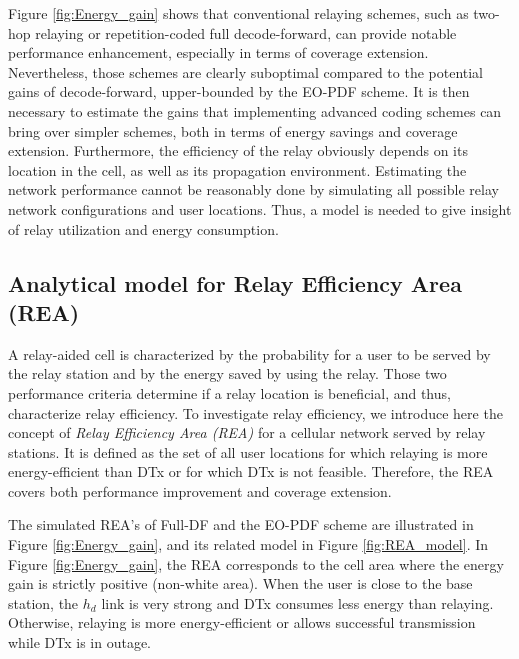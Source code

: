 \documentclass[journal]{IEEEtran}
\theoremstyle{definition}
\begin{document}
Figure \ref{fig:Energy_gain} shows that conventional relaying schemes, such as two-hop relaying or repetition-coded full decode-forward, can provide notable performance enhancement, especially in terms of coverage extension. Nevertheless, those schemes are clearly suboptimal compared to the potential gains of decode-forward, upper-bounded by the EO-PDF scheme. It is then necessary to estimate the gains that implementing advanced coding schemes can bring over simpler schemes, both in terms of energy savings and coverage extension. Furthermore, the efficiency of the relay obviously depends on its location in the cell, as well as its propagation environment. 
Estimating the network performance cannot be reasonably done by simulating all possible relay network configurations and user locations. Thus, a model is needed to give insight of relay utilization and energy consumption.



\subsection{Analytical model for Relay Efficiency Area (REA)}

A relay-aided cell is characterized by the probability for a user to be served by the relay station and by the energy saved by using the relay. Those two performance criteria determine if a relay location is beneficial, and thus, characterize relay efficiency.
To investigate relay efficiency, we introduce here the concept of \textit{Relay Efficiency Area (REA)} for a cellular network served by relay stations. It is defined as the set of all user locations for which relaying is more energy-efficient than DTx or for which DTx is not feasible. Therefore, the REA covers both performance improvement and coverage extension.  

The simulated REA's of Full-DF and the EO-PDF scheme are illustrated in Figure \ref{fig:Energy_gain}, and its related model in Figure \ref{fig:REA_model}. In Figure \ref{fig:Energy_gain}, the REA corresponds to the cell area where the energy gain is strictly positive (non-white area).
When the user is close to the base station, the $h_d$ link is very strong and DTx consumes less energy than relaying. Otherwise, relaying is more energy-efficient or allows successful transmission while DTx is in outage.
\end{document}
